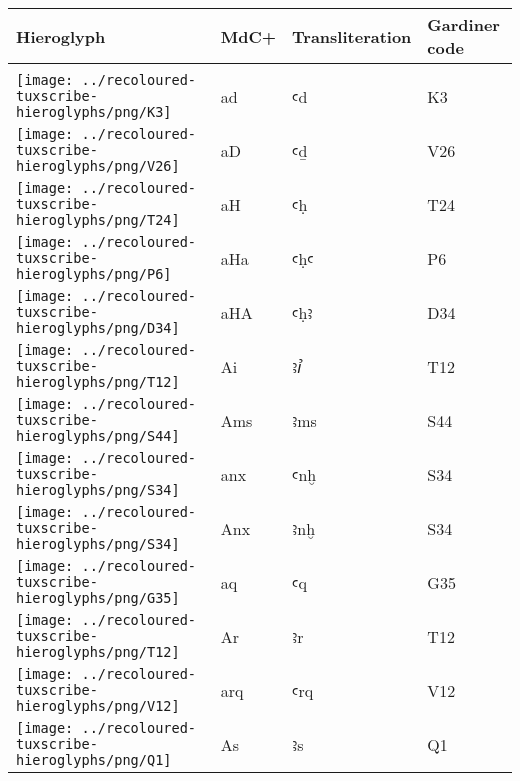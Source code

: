 \begin{center}
	\begin{tabularx}{\linewidth}{YYYY}
		Hieroglyph & MdC+ & Transliteration & Gardiner code\\
		\hline\\
		\texttt{[image: ../recoloured-tuxscribe-hieroglyphs/png/K3]} & ad & ꜥd & K3 \\ 
		\texttt{[image: ../recoloured-tuxscribe-hieroglyphs/png/V26]} & aD & ꜥḏ & V26 \\ 
		\texttt{[image: ../recoloured-tuxscribe-hieroglyphs/png/T24]} & aH & ꜥḥ & T24 \\ 
		\texttt{[image: ../recoloured-tuxscribe-hieroglyphs/png/P6]} & aHa & ꜥḥꜥ & P6 \\ 
		\texttt{[image: ../recoloured-tuxscribe-hieroglyphs/png/D34]} & aHA & ꜥḥꜣ & D34 \\ 
		\texttt{[image: ../recoloured-tuxscribe-hieroglyphs/png/T12]} & Ai & ꜣꞽ & T12 \\ 
		\texttt{[image: ../recoloured-tuxscribe-hieroglyphs/png/S44]} & Ams & ꜣms & S44 \\ 
		\texttt{[image: ../recoloured-tuxscribe-hieroglyphs/png/S34]} & anx & ꜥnḫ & S34 \\ 
		\texttt{[image: ../recoloured-tuxscribe-hieroglyphs/png/S34]} & Anx & ꜣnḫ & S34 \\ 
		\texttt{[image: ../recoloured-tuxscribe-hieroglyphs/png/G35]} & aq & ꜥq & G35 \\ 
		\texttt{[image: ../recoloured-tuxscribe-hieroglyphs/png/T12]} & Ar & ꜣr & T12 \\ 
		\texttt{[image: ../recoloured-tuxscribe-hieroglyphs/png/V12]} & arq & ꜥrq & V12 \\ 
		\texttt{[image: ../recoloured-tuxscribe-hieroglyphs/png/Q1]} & As & ꜣs & Q1 \\ 
	\end{tabularx}
\end{center}



